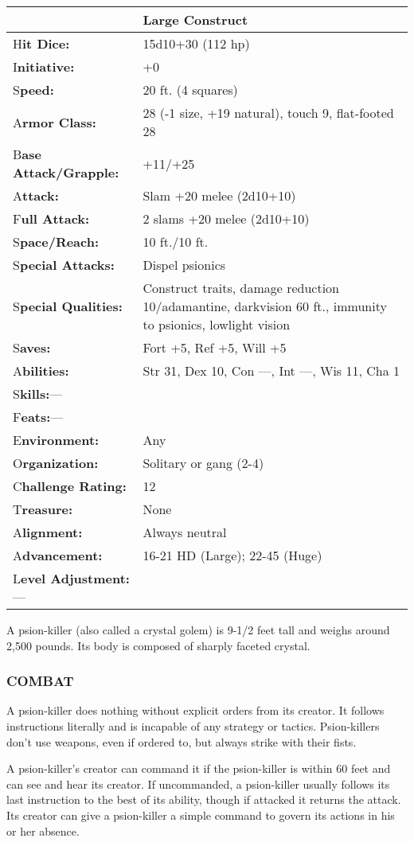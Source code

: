 \documentclass{article}
\begin{document}
\begin{tabular}{|>{\raggedright}p{91pt}|>{\raggedright}p{228pt}|}
\hline
  & Large Construct\tabularnewline
\hline
H\textbf{it Dice:} & 15d10+30 (112 hp)\tabularnewline
\hline
I\textbf{nitiative:} & +0\tabularnewline
\hline
S\textbf{peed:} & 20 ft. (4 squares)\tabularnewline
\hline
A\textbf{rmor Class:} & 28 (-1 size, +19 natural), touch 9, flat-footed 28\tabularnewline
\hline
B\textbf{ase Attack/Grapple:} & +11/+25\tabularnewline
\hline
A\textbf{ttack:} & Slam +20 melee (2d10+10)\tabularnewline
\hline
F\textbf{ull Attack:} & 2 slams +20 melee (2d10+10)\tabularnewline
\hline
S\textbf{pace/Reach:} & 10 ft./10 ft.\tabularnewline
\hline
S\textbf{pecial Attacks:} & Dispel psionics\tabularnewline
\hline
S\textbf{pecial Qualities:} & Construct traits, damage reduction 10/adamantine, 
darkvision 60 ft., immunity to psionics, lowlight vision\tabularnewline
\hline
S\textbf{aves:} & Fort +5, Ref +5, Will +5\tabularnewline
\hline
A\textbf{bilities:} & Str 31, Dex 10, Con ---, Int ---, Wis 11, Cha 1\tabularnewline
\hline
S\textbf{kills:}--- & \tabularnewline
\hline
F\textbf{eats:}--- & \tabularnewline
\hline
E\textbf{nvironment:} & Any\tabularnewline
\hline
O\textbf{rganization:} & Solitary or gang (2-4)\tabularnewline
\hline
C\textbf{hallenge Rating:} & 12\tabularnewline
\hline
T\textbf{reasure:} & None\tabularnewline
\hline
A\textbf{lignment:} & Always neutral\tabularnewline
\hline
A\textbf{dvancement:} & 16-21 HD (Large); 22-45 (Huge)\tabularnewline
\hline
L\textbf{evel Adjustment:}--- & \tabularnewline
\hline
\end{tabular}

A psion-killer (also called a crystal golem) is 9-1/2 feet tall and weighs around 
2,500 pounds. Its body is composed of sharply faceted crystal.

\subsubsection*{COMBAT}

A psion-killer does nothing without explicit orders from its creator. It follows 
instructions literally and is incapable of any strategy or tactics. Psion-killers 
don't use weapons, even if ordered to, but always strike with their fists. 

A psion-killer's creator can command it if the psion-killer is within 60 feet and 
can see and hear its creator. If uncommanded, a psion-killer usually follows its 
last instruction to the best of its ability, though if attacked it returns the 
attack. Its creator can give a psion-killer a simple command to govern its actions 
in his or her absence.
\end{document}
